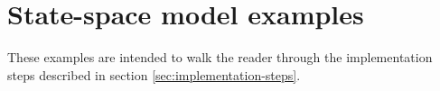 \section{State-space model examples}

These examples are intended to walk the reader through the implementation steps
described in section \ref{sec:implementation-steps}.






